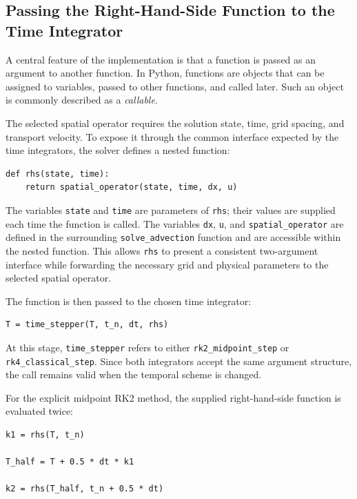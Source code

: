 \subsection{Passing the Right-Hand-Side Function to the Time Integrator}
\label{subsec:rhs-function-passing}

A central feature of the implementation is that a function is passed as an argument to another function. In Python, functions are objects that can be assigned to variables, passed to other functions, and called later. Such an object is commonly described as a \emph{callable}.

The selected spatial operator requires the solution state, time, grid spacing, and transport velocity. To expose it through the common interface expected by the time integrators, the solver defines a nested function:

\begin{verbatim}
def rhs(state, time):
    return spatial_operator(state, time, dx, u)
\end{verbatim}

The variables \texttt{state} and \texttt{time} are parameters of \texttt{rhs}; their values are supplied each time the function is called. The variables \texttt{dx}, \texttt{u}, and \texttt{spatial\_operator} are defined in the surrounding \texttt{solve\_advection} function and are accessible within the nested function. This allows \texttt{rhs} to present a consistent two-argument interface while forwarding the necessary grid and physical parameters to the selected spatial operator.

The function is then passed to the chosen time integrator:

\begin{verbatim}
T = time_stepper(T, t_n, dt, rhs)
\end{verbatim}

At this stage, \texttt{time\_stepper} refers to either \texttt{rk2\_midpoint\_step} or \texttt{rk4\_classical\_step}. Since both integrators accept the same argument structure, the call remains valid when the temporal scheme is changed.

For the explicit midpoint RK2 method, the supplied right-hand-side function is evaluated twice:

\begin{verbatim}
k1 = rhs(T, t_n)

T_half = T + 0.5 * dt * k1

k2 = rhs(T_half, t_n + 0.5 * dt)
\end{verbatim}

